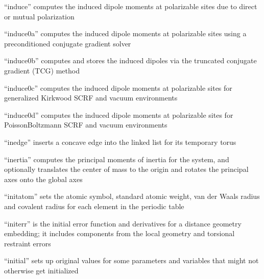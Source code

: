 \documentclass[letterpaper,11pt,english]{sphinxmanual}
\begin{document}
\sphinxAtStartPar
“induce” computes the induced dipole moments at polarizable sites due to direct or mutual polarization

\sphinxAtStartPar
{}

\sphinxAtStartPar
“induce0a” computes the induced dipole moments at polarizable sites using a preconditioned conjugate gradient solver

\sphinxAtStartPar
{}

\sphinxAtStartPar
“induce0b” computes and stores the induced dipoles via the truncated conjugate gradient (TCG) method

\sphinxAtStartPar
{}

\sphinxAtStartPar
“induce0c” computes the induced dipole moments at polarizable sites for generalized Kirkwood SCRF and vacuum environments

\sphinxAtStartPar
{}

\sphinxAtStartPar
“induce0d” computes the induced dipole moments at polarizable sites for Poisson\sphinxhyphen{}Boltzmann SCRF and vacuum environments

\sphinxAtStartPar
{}

\sphinxAtStartPar
“inedge” inserts a concave edge into the linked list for its temporary torus

\sphinxAtStartPar
{}

\sphinxAtStartPar
“inertia” computes the principal moments of inertia for the system, and optionally translates the center of mass to the origin and rotates the principal axes onto the global axes

\sphinxAtStartPar
{}

\sphinxAtStartPar
“initatom” sets the atomic symbol, standard atomic weight, van der Waals radius and covalent radius for each element in the periodic table

\sphinxAtStartPar
{}

\sphinxAtStartPar
“initerr” is the initial error function and derivatives for a distance geometry embedding; it includes components from the local geometry and torsional restraint errors

\sphinxAtStartPar
{}

\sphinxAtStartPar
“initial” sets up original values for some parameters and variables that might not otherwise get initialized
\end{document}
